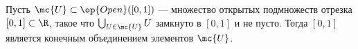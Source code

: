 \documentclass[
	extrafontsizes,
	11pt,
	hyphens,
]{memoir}
\begin{document}
\begin{theorem}
\label{thm:RealClIntCompConn}
Пусть \(\mc{U} \subset \op{Open}([0,1])\) --- множество открытых подмножеств отрезка \([0,1] \subset \R\),
такое что \(\bigcup_{U \in \mc{U}} U\)
замкнуто в \([0,1]\) и не пусто.
Тогда \([0,1]\) является конечным объединением элементов \(\mc{U}\).
\end{theorem}

\end{document}
